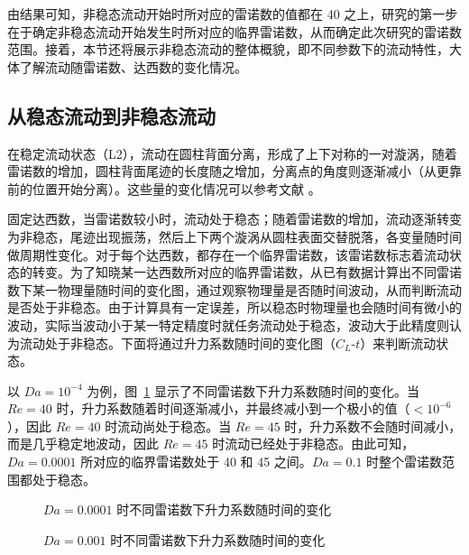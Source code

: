 由结果可知，非稳态流动开始时所对应的雷诺数的值都在 40 之上，研究的第一步在于确定非稳态流动开始发生时所对应的临界雷诺数，从而确定此次研究的雷诺数范围。接着，本节还将展示非稳态流动的整体概貌，即不同参数下的流动特性，大体了解流动随雷诺数、达西数的变化情况。

\subsection{从稳态流动到非稳态流动}

在稳定流动状态（L2），流动在圆柱背面分离，形成了上下对称的一对漩涡，随着雷诺数的增加，圆柱背面尾迹的长度随之增加，分离点的角度则逐渐减小（从更靠前的位置开始分离）。这些量的变化情况可以参考文献 \cite{}。

固定达西数，当雷诺数较小时，流动处于稳态；随着雷诺数的增加，流动逐渐转变为非稳态，尾迹出现振荡，然后上下两个漩涡从圆柱表面交替脱落，各变量随时间做周期性变化。对于每个达西数，都存在一个临界雷诺数，该雷诺数标志着流动状态的转变。为了知晓某一达西数所对应的临界雷诺数，从已有数据计算出不同雷诺数下某一物理量随时间的变化图，通过观察物理量是否随时间波动，从而判断流动是否处于非稳态。由于计算具有一定误差，所以稳态时物理量也会随时间有微小的波动，实际当波动小于某一特定精度时就任务流动处于稳态，波动大于此精度则认为流动处于非稳态。下面将通过升力系数随时间的变化图（$C_L$-$t$）来判断流动状态。

以 $Da=10^{-4}$ 为例，图~\ref{fig: Cl_t-1e-4} 显示了不同雷诺数下升力系数随时间的变化。当 $Re=40$ 时，升力系数随着时间逐渐减小，并最终减小到一个极小的值（$<10^{-6}$），因此 $Re=40$ 时流动尚处于稳态。当 $Re=45$ 时，升力系数不会随时间减小，而是几乎稳定地波动，因此 $Re=45$ 时流动已经处于非稳态。由此可知，$Da=0.0001$ 所对应的临界雷诺数处于 40 和 45 之间。$Da=0.1$ 时整个雷诺数范围都处于稳态。

\begin{figure}
	\setlength{\subfigcapskip}{-1bp}
	\centering
	\begin{minipage}{\textwidth}
		\centering
	\end{minipage}
	\vspace{0.2em}
	\caption{$Da=0.0001$ 时不同雷诺数下升力系数随时间的变化}
	\label{fig: Cl_t-1e-4}
\end{figure}

\begin{figure}
	\setlength{\subfigcapskip}{-1bp}
	\centering
	\begin{minipage}{\textwidth}
		\centering
	\end{minipage}
	\vspace{0.2em}
	\caption{$Da=0.001$ 时不同雷诺数下升力系数随时间的变化}
	\label{fig: Cl_t-1e-3}
\end{figure}


